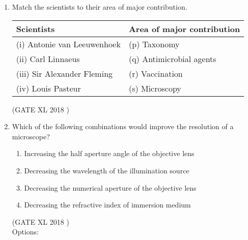 \documentclass[14pt]{extarticle}
\begin{document}
\begin{flushleft}
\begin{enumerate}
\item Match the scientists to their area of major contribution.  
\begin{center}
\begin{tabular}{|l|l|}
\hline
\textbf{Scientists} & \textbf{Area of major contribution} \\ \hline
(i) Antonie van Leeuwenhoek & (p) Taxonomy \\ 
(ii) Carl Linnaeus & (q) Antimicrobial agents \\ 
(iii) Sir Alexander Fleming & (r) Vaccination \\ 
(iv) Louis Pasteur & (s) Microscopy \\ \hline
\end{tabular}
\end{center}
\hfill(GATE XL 2018 )\\
\begin{enumerate}
\end{enumerate}

\item Which of the following combinations would improve the resolution of a microscope?
\begin{enumerate}[label=(\roman*)]
  \item Increasing the half aperture angle of the objective lens
  \item Decreasing the wavelength of the illumination source
  \item Decreasing the numerical aperture of the objective lens
  \item Decreasing the refractive index of immersion medium
\end{enumerate}
\hfill(GATE XL 2018 )\\
Options:
\begin{enumerate}
\end{enumerate}


\end{enumerate}
\end{flushleft}
\end{document}
